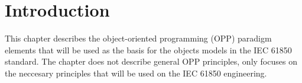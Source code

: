 \section{Introduction}

This chapter describes the object-oriented programming (OPP) paradigm 
elements that will be used as the basis for the objects models 
in the IEC 61850 standard. The chapter does not describe 
general OPP principles, only focuses on 
the neccesary principles that will be used 
on the IEC 61850 engineering.